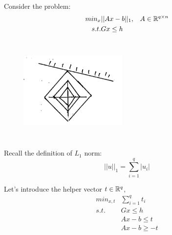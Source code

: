 \begin{example}
	Consider the problem:
	\begin{align*}
		min_x &||Ax - b||_1, \,\,\,\,\, A\in \mathbb{R}^{q\times n}\\
		s.t. &Gx\leq h
	\end{align*}
	\begin{figure}
		\centering
		\includegraphics[width=2.1in,height=2.1in]{figures/ch07/figure1016_3.png}
	\end{figure}
	
	Recall the definition of $L_1$ norm:
	\begin{equation*}
		||u||_1 = \sum^q_{i=1} |u_i|
	\end{equation*}
	
	
	Let's introduce the helper vector $t\in \mathbb{R}^q$,
	\begin{align*}
		min_{x,t} &\sum^q_{i=1}t_i\\
		s.t. \,\,\,\,\,&Gx \leq h\\
		&Ax -b \leq t\\
		&Ax -b \geq -t
	\end{align*}
	
\end{example}



